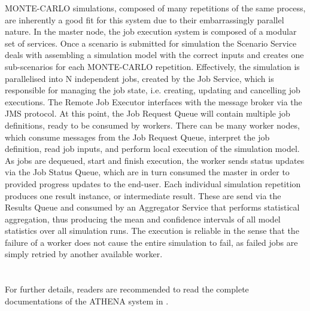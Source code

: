 MONTE-CARLO simulations, composed of many repetitions of the same process, are inherently a good fit for this system due to their embarrassingly parallel nature. 
In the master node, the job execution system is composed of a modular set of services. Once a scenario is submitted for simulation the Scenario Service deals with assembling a simulation model with the correct inputs and creates one sub-scenarios for each MONTE-CARLO repetition. Effectively, the simulation is parallelised into N independent jobs, created by the Job Service, which is responsible for managing the job state, i.e. creating, updating and cancelling job executions. The Remote Job Executor interfaces with the message broker via the JMS protocol. At this point, the Job Request Queue will contain multiple job definitions, ready to be consumed by workers. 
There can be many worker nodes, which consume messages from the Job Request Queue, interpret the job definition, read job inputs, and perform local execution of the simulation model. As jobs are dequeued, start and finish execution, the worker sends status updates via the Job Status Queue, which are in turn consumed the master in order to provided progress updates to the end-user. Each individual simulation repetition produces one result instance, or intermediate result. These are send via the Results Queue and consumed by an Aggregator Service that performs statistical aggregation, thus producing the mean and confidence intervals of all model statistics over all simulation runs. The execution is reliable in the sense that the failure of a worker does not cause the entire simulation to fail, as failed jobs are simply retried by another available worker. 
\\
\\
\\
For further details, readers are recommended to read the complete documentations of the ATHENA system in \parencite{athenaAllDoc}.
